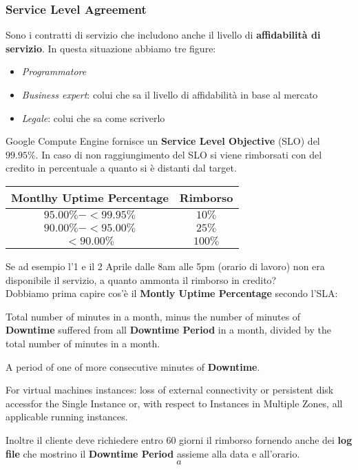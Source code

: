 \subsubsection{Service Level Agreement}
Sono i contratti di servizio che includono anche il livello di \textbf{affidabilità di servizio}. In questa situazione abbiamo tre figure:
\begin{itemize}
	\item \textit{Programmatore}
	\item \textit{Business expert}: colui che sa il livello di affidabilità in base al mercato
	\item \textit{Legale}: colui che sa come scriverlo
\end{itemize}
\begin{example}
	Google Compute Engine fornisce un \textbf{Service Level Objective} (SLO) del $99.95\%$. In caso di non raggiungimento del SLO si viene rimborsati con del credito in percentuale a quanto si è distanti dal target.\\
	\begin{center}
		\begin{tabular}{|c|c|}
			\hline
			\textbf{Montlhy Uptime Percentage} & \textbf{Rimborso} \\
			\hline
			$95.00\%-<99.95\%$ & $10\%$ \\
			\hline
			$90.00\%-<95.00\%$ & $25\%$ \\
			\hline
			$<90.00\%$ & $100\%$ \\
			\hline
		\end{tabular}
	\end{center}
	Se ad esempio l'1 e il 2 Aprile dalle 8am alle 5pm (orario di lavoro) non era disponibile il servizio, a quanto ammonta il rimborso in credito?\\
	Dobbiamo prima capire cos'è il \textbf{Montly Uptime Percentage} secondo l'SLA:
	\begin{definition}
		Total number of minutes in a month, minus the number of minutes of \textbf{Downtime} suffered from all \textbf{Downtime Period} in a month, divided by the total number of minutes in a month.
	\end{definition}
	\begin{definition}
		A period of one of more consecutive minutes of \textbf{Downtime}.
	\end{definition}
	\begin{definition}[Downtime]
		For virtual machines instances: loss of external connectivity or persistent disk accessfor the Single Instance or, with respect to Instances in Multiple Zones, all applicable running instances.
	\end{definition}
	Inoltre il cliente deve richiedere entro 60 giorni il rimborso fornendo anche dei \textbf{log file} che mostrino il \textbf{Downtime Period} assieme alla data e all'orario.
	\begin{equation*}
		a
	\end{equation*}
\end{example}

